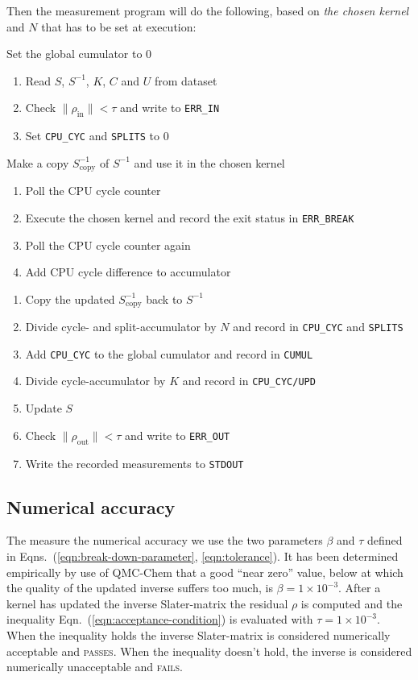 \documentclass[11pt]{article}
\numberwithin{figure}{section}
\numberwithin{table}{section}
\begin{document}
			Then the measurement program will do the following, based on \emph{the chosen kernel} and $N$ that has to be set at execution:\\
\begin{algorithm}[H]
Set the global cumulator to 0\;
 {
	\begin{enumerate}
		\item Read $S$, $S^{-1}$, $K$, $C$ and $U$ from dataset
		\item Check $\|\rho_\mathrm{in}\|<\tau$ and write to \texttt{ERR\_IN}
		\item Set \texttt{CPU\_CYC} and \texttt{SPLITS} to 0
	\end{enumerate}
	 {
		Make a copy $S_\mathrm{copy}^{-1}$ of $S^{-1}$ and use it in the chosen kernel\;
		 {
			\begin{enumerate}
				\item Poll the CPU cycle counter
				\item Execute the chosen kernel and record the exit status in \texttt{ERR\_BREAK}
				\item Poll the CPU cycle counter again
				\item Add CPU cycle difference to accumulator
			\end{enumerate}
		}
	}
	\begin{enumerate}
		\item Copy the updated $S_\mathrm{copy}^{-1}$ back to $S^{-1}$
		\item Divide cycle- and split-accumulator by $N$ and record in \texttt{CPU\_CYC} and \texttt{SPLITS}
		\item Add \texttt{CPU\_CYC} to the global cumulator and record in \texttt{CUMUL}
		\item Divide cycle-accumulator by $K$ and record in \texttt{CPU\_CYC/UPD}
		\item Update $S$
		\item Check $\|\rho_\mathrm{out}\|<\tau$ and write to \texttt{ERR\_OUT}
		\item Write the recorded measurements to \texttt{STDOUT}
	\end{enumerate}
}
\end{algorithm}
		
			\subsection{Numerical accuracy}
			
				The measure the numerical accuracy we use the two parameters $\beta$ and $\tau$ defined in Eqns.~(\ref{eqn:break-down-parameter}, \ref{eqn:tolerance}). It has been determined empirically by use of QMC-Chem that a good ``near zero'' value, below at which the quality of the updated inverse suffers too much, is $\beta=1\times 10^{-3}$. After a kernel has updated the inverse Slater-matrix the residual $\rho$ is computed and the inequality Eqn.~(\ref{eqn:acceptance-condition}) is evaluated with $\tau=1\times 10^{-3}$. When the inequality holds the inverse Slater-matrix is considered numerically acceptable and \textsc{passes}. When the inequality doesn't hold, the inverse is considered numerically unacceptable and \textsc{fails}.\\
				
\end{document}

